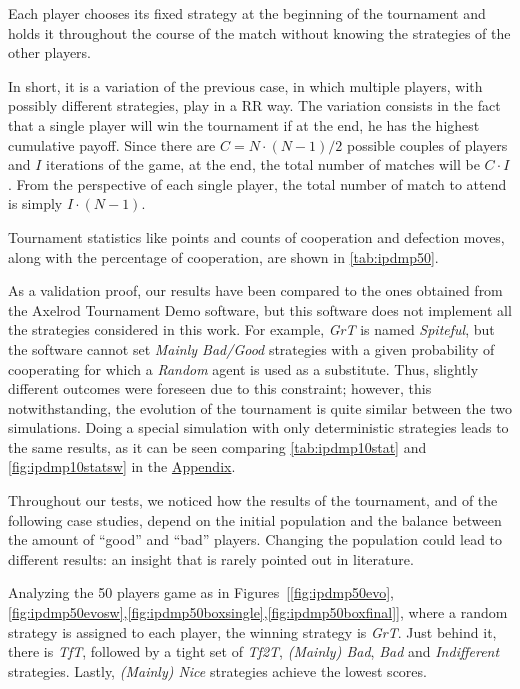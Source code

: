 \documentclass[journal,10pt,twoside]{IEEEtran}
\begin{document}
Each player chooses its fixed strategy at the beginning of the tournament and holds it throughout the course of the match without knowing the strategies of the other players.

In short, it is a variation of the previous case, in which multiple players, with possibly different strategies, play in a RR way. The variation consists in the fact that a single player will win the tournament if at the end, he has the highest cumulative payoff.
Since there are $C=N\cdot (N-1)/2$ possible couples of players and $I$ iterations of the game, at the end, the total number of matches will be $C\cdot I$. From the perspective of each single player, the total number of match to attend is simply $I\cdot(N-1)$.

Tournament statistics like points and counts of cooperation and defection moves, along with the percentage of cooperation, are shown in \autoref{tab:ipdmp50}.

As a validation proof, our results have been compared to the ones obtained from the Axelrod Tournament Demo software, \cite{demosw} but this software does not implement all the strategies considered in this work. For example, \textit{GrT} is named \textit{Spiteful}, but the software cannot set \textit{Mainly Bad/Good} strategies with a given probability of cooperating for which a \textit{Random} agent is used as a substitute. Thus, slightly different outcomes were foreseen due to this constraint; however, this notwithstanding, the evolution of the tournament is quite similar between the two simulations.
Doing a special simulation with only deterministic strategies leads to the same results, as it can be seen comparing \autoref{tab:ipdmp10stat} and \autoref{fig:ipdmp10statsw} in the \hyperref[s:appendix]{Appendix}.

Throughout our tests, we noticed how the results of the tournament, and of the following case studies, depend on the initial population and the balance between the amount of ``good'' and ``bad'' players. Changing the population could lead to different results: an insight that is rarely pointed out in literature.

Analyzing the 50 players game as in Figures~[\ref{fig:ipdmp50evo},\ref{fig:ipdmp50evosw},\ref{fig:ipdmp50boxsingle},\ref{fig:ipdmp50boxfinal}], where a random strategy is assigned to each player, the winning strategy is \textit{GrT}. Just behind it, there is \textit{TfT}, followed by a tight set of \textit{Tf2T}, \textit{(Mainly) Bad}, \textit{Bad} and \textit{Indifferent} strategies. Lastly, \textit{(Mainly) Nice} strategies achieve the lowest scores.
\end{document}

